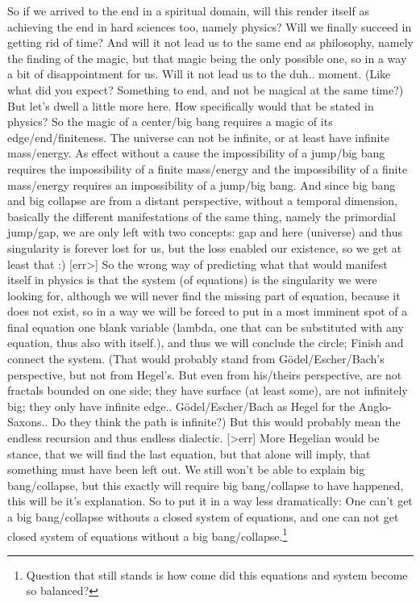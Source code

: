 \documentclass[10pt]{book}
\begin{document}
So if we arrived to the end in a spiritual domain, will this render itself as achieving the end in hard sciences too, namely physics? Will we finally succeed in getting rid of time? And will it not lead us to the same end as philosophy, namely the finding of the magic, but that magic being the only possible one, so in a way a bit of disappointment for us. Will it not lead us to the duh.. moment. (Like what did you expect? Something to end, and not be magical at the same time?) But let's dwell a little more here. How specifically would that be stated in physics?
So the magic of a center/big bang requires a magic of its edge/end/finiteness. The universe can not be infinite, or at least have infinite mass/energy. As effect without a cause the impossibility of a jump/big bang requires the impossibility of a finite mass/energy and the impossibility of a finite mass/energy requires an impossibility of a jump/big bang. 
And since big bang and big collapse are from a distant perspective, without a temporal dimension, basically the different manifestations of the same thing, namely the primordial jump/gap, we are only left with two concepts: gap and here (universe) and thus singularity is forever lost for us, but the loss enabled our existence, so we get at least that :)
[err>] So the wrong way of predicting what that would manifest itself in physics is that the system (of equations) is the singularity we were looking for, although we will never find the missing part of equation, because it does not exist, so in a way we will be forced to put in a most imminent spot of a final equation one blank variable (lambda, one that can be substituted with any equation, thus also with itself.), and thus we will conclude the circle; Finish and connect the system.
(That would probably stand from Gödel/Escher/Bach's perspective, but not from Hegel's. But even from his/theirs perspective, are not fractals bounded on one side; they have surface (at least some), are not infinitely big; they only have infinite edge.. Gödel/Escher/Bach as Hegel for the Anglo-Saxons.. Do they think the path is infinite?) But this would probably mean the endless recursion and thus endless dialectic. [>err] More Hegelian would be stance, that we will find the last equation, but that alone will imply, that something must have been left out. We still won't be able to explain big bang/collapse, but this exactly will require big bang/collapse to have happened, this will be it's explanation.
So to put it in a way less dramatically: One can't get a big bang/collapse withouts a closed system of equations, and one can not get closed system of equations without a big bang/collapse.\footnote{Question that still stands is how come did this equations and system become so balanced?}
\end{document}
